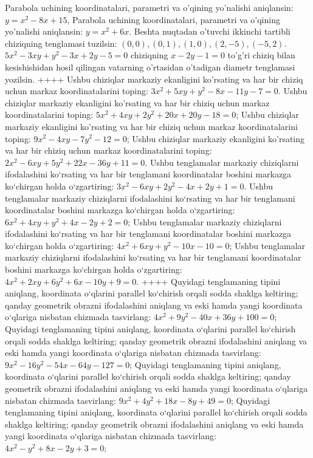 Parabola uchining koordinatalari, parametri va o'qining yo'nalishi aniqlansin: $y=x^2-8 x+15$,
Parabola uchining koordinatalari, parametri va o'qining yo'nalishi aniqlansin: $y=x^2+6 x$.
Beshta nuqtadan o'tuvchi ikkinchi tartibli chiziqning tenglamasi tuzilsin: $(0,0),(0,1),(1,0),(2,-5),(-5,2)$.
$5 x^2-3 x y+y^2-3 x+2 y-5=0$ chiziqning $x-2 y-1=0$ to'g'ri chiziq bilan kesishishidan hosil qilingan vatarning o'rtasidan o'tadigan diametr tenglamasi yozilsin.
++++
Ushbu chiziqlar markaziy ekanligini ko'rsating va har bir chiziq uchun markaz koordinatalarini toping: $3x^2+5xy+y^2-8x-11y-7=0$.
Ushbu chiziqlar markaziy ekanligini ko'rsating va har bir chiziq uchun markaz koordinatalarini toping: $5 x^2+4 x y+2 y^2+20 x+20 y-18=0$;
Ushbu chiziqlar markaziy ekanligini ko'rsating va har bir chiziq uchun markaz koordinatalarini toping: $9 x^2-4 x y-7 y^2-12=0$;
Ushbu chiziqlar markaziy ekanligini ko'rsating va har bir chiziq uchun markaz koordinatalarini toping: $2 x^2-6 x y+5 y^2+22 x-36 y+11=0$.
Ushbu tenglamalar markaziy chiziqlarni ifodalashini ko‘rsating va har bir tenglamani koordinatalar boshini markazga ko‘chirgan holda o‘zgartiring: $3x^2-6xy+2y^2-4x+2y+1=0$.
Ushbu tenglamalar markaziy chiziqlarni ifodalashini ko‘rsating va har bir tenglamani koordinatalar boshini markazga ko‘chirgan holda o‘zgartiring: $6 x^2+4 x y+y^2+4 x-2 y+2=0$;
Ushbu tenglamalar markaziy chiziqlarni ifodalashini ko‘rsating va har bir tenglamani koordinatalar boshini markazga ko‘chirgan holda o‘zgartiring: $4 x^2+6 x y+y^2-10 x-10=0$;
Ushbu tenglamalar markaziy chiziqlarni ifodalashini ko‘rsating va har bir tenglamani koordinatalar boshini markazga ko‘chirgan holda o‘zgartiring: $4 x^2+2 x y+6 y^2+6 x-10 y+9=0$.
++++
Quyidagi tenglamaning tipini aniqlang, koordinata o‘qlarini parallel ko‘chirish orqali sodda shaklga keltiring; qanday geometrik obrazni ifodalashini aniqlang va eski hamda yangi koordinata o‘qlariga nisbatan chizmada tasvirlang: $4 x^2+9 y^2-40 x+36 y+100=0$;
Quyidagi tenglamaning tipini aniqlang, koordinata o‘qlarini parallel ko‘chirish orqali sodda shaklga keltiring; qanday geometrik obrazni ifodalashini aniqlang va eski hamda yangi koordinata o‘qlariga nisbatan chizmada tasvirlang: $9 x^2-16 y^2-54 x-64 y-127=0$;
Quyidagi tenglamaning tipini aniqlang, koordinata o‘qlarini parallel ko‘chirish orqali sodda shaklga keltiring; qanday geometrik obrazni ifodalashini aniqlang va eski hamda yangi koordinata o‘qlariga nisbatan chizmada tasvirlang: $9 x^2+4 y^2+18 x-8 y+49=0$;
Quyidagi tenglamaning tipini aniqlang, koordinata o‘qlarini parallel ko‘chirish orqali sodda shaklga keltiring; qanday geometrik obrazni ifodalashini aniqlang va eski hamda yangi koordinata o‘qlariga nisbatan chizmada tasvirlang: $4 x^2-y^2+8 x-2 y+3=0$;
